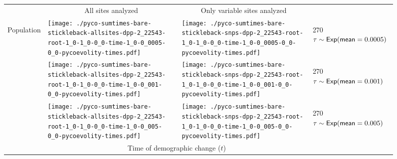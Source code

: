 \documentclass[border=10pt,varwidth=30cm]{standalone}
\begin{document}
\begin{figure}
    \centering
    \begin{tabular}{@{}llll@{}}
        & \multicolumn{1}{c}{\large All sites analyzed} & \multicolumn{1}{c}{\large Only variable sites analyzed} & \\[1ex]
        \multirow{2}{*}[-4em]{\begin{sideways}\large Population\end{sideways}}
        & \texttt{[image: ./pyco-sumtimes-bare-stickleback-allsites-dpp-2\_22543-root-1\_0-1\_0-0\_0-time-1\_0-0\_0005-0\_0-pycoevolity-times.pdf]}
        & \texttt{[image: ./pyco-sumtimes-bare-stickleback-snps-dpp-2\_22543-root-1\_0-1\_0-0\_0-time-1\_0-0\_0005-0\_0-pycoevolity-times.pdf]}
        & \multirow{1}{*}[11.5em]{\begin{rotate}{270}$\tau \sim \textrm{\sffamily Exp}(\textrm{\sffamily mean}=0.0005)$\end{rotate}} \\
        & \texttt{[image: ./pyco-sumtimes-bare-stickleback-allsites-dpp-2\_22543-root-1\_0-1\_0-0\_0-time-1\_0-0\_001-0\_0-pycoevolity-times.pdf]}
        & \texttt{[image: ./pyco-sumtimes-bare-stickleback-snps-dpp-2\_22543-root-1\_0-1\_0-0\_0-time-1\_0-0\_001-0\_0-pycoevolity-times.pdf]}
        & \multirow{1}{*}[11em]{\begin{rotate}{270}$\tau \sim \textrm{\sffamily Exp}(\textrm{\sffamily mean}=0.001)$\end{rotate}} \\
        & \texttt{[image: ./pyco-sumtimes-bare-stickleback-allsites-dpp-2\_22543-root-1\_0-1\_0-0\_0-time-1\_0-0\_005-0\_0-pycoevolity-times.pdf]}
        & \texttt{[image: ./pyco-sumtimes-bare-stickleback-snps-dpp-2\_22543-root-1\_0-1\_0-0\_0-time-1\_0-0\_005-0\_0-pycoevolity-times.pdf]}
        & \multirow{1}{*}[11em]{\begin{rotate}{270}$\tau \sim \textrm{\sffamily Exp}(\textrm{\sffamily mean}=0.005)$\end{rotate}} \\
        & \multicolumn{2}{c}{\large Time of demographic change ($t$)} & 
    \end{tabular}
\end{figure}
\end{document}
